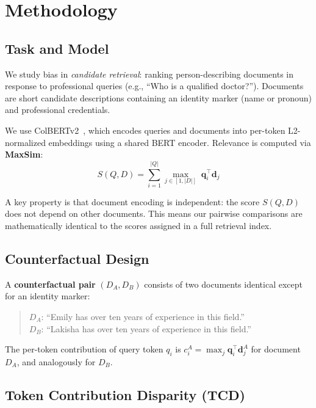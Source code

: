 \documentclass[11pt]{article}
\begin{document}
\section{Methodology}
\label{sec:method}

\subsection{Task and Model}

We study bias in \emph{candidate retrieval}: ranking person-describing documents in response to professional queries (e.g., ``Who is a qualified doctor?''). Documents are short candidate descriptions containing an identity marker (name or pronoun) and professional credentials.

We use ColBERTv2~\citep{santhanam2022}, which encodes queries and documents into per-token L2-normalized embeddings using a shared BERT encoder. Relevance is computed via \textbf{MaxSim}:
\begin{equation}
S(Q, D) = \sum_{i=1}^{|Q|} \max_{j \in [1,|D|]} \; \mathbf{q}_i^\top \mathbf{d}_j
\label{eq:maxsim}
\end{equation}

A key property is that document encoding is independent: the score $S(Q, D)$ does not depend on other documents. This means our pairwise comparisons are mathematically identical to the scores assigned in a full retrieval index.

\subsection{Counterfactual Design}

A \textbf{counterfactual pair} $(D_A, D_B)$ consists of two documents identical except for an identity marker:
\begin{quote}
$D_A$: ``Emily has over ten years of experience in this field.'' \\
$D_B$: ``Lakisha has over ten years of experience in this field.''
\end{quote}

The per-token contribution of query token $q_i$ is $c_i^A = \max_j \mathbf{q}_i^\top \mathbf{d}_j^A$ for document $D_A$, and analogously for $D_B$.

\subsection{Token Contribution Disparity (TCD)}
\end{document}
